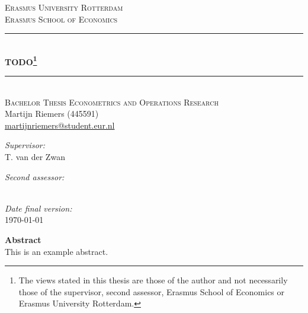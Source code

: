 \begin{titlepage}
	\thispagestyle{empty}
	
	\begin{center}
		\textsc{\Large{Erasmus University Rotterdam}}\\[.7cm]
		\textsc{Erasmus School of Economics}\\[0.5cm]
		
		\rule{\linewidth}{0.5mm} \\[0.4cm]
		\huge{\bfseries{TODO\footnote{The views stated in this thesis are those of the author and not necessarily those of the supervisor, second assessor, Erasmus School of Economics or Erasmus University Rotterdam.}}} \\
		\rule{\linewidth}{0.5mm} \\[.5cm]
		
		\textsc{\large{Bachelor Thesis Econometrics and Operations Research}} \\[.5cm]
		
		\large{Martijn Riemers (445591)} \\
		\large{\href{mailto:martijnriemers@student.eur.nl}{martijnriemers@student.eur.nl}} \\[.75cm]	
		
		\begin{minipage}[t]{0.4\textwidth}
		\center
		\large{\emph{Supervisor:}}\\
		\large{T. van der Zwan}
		\end{minipage}
		\begin{minipage}[t]{0.4\textwidth}
		\center
		\large{\emph{Second assessor:}} \\
		\end{minipage}\\[.75cm]
		
		\large{\emph{Date final version:}} \\
		\large{\today} \\[4cm]
	\end{center}
	
	\large{\textbf{Abstract}} \\
	This is an example abstract.
\end{titlepage}